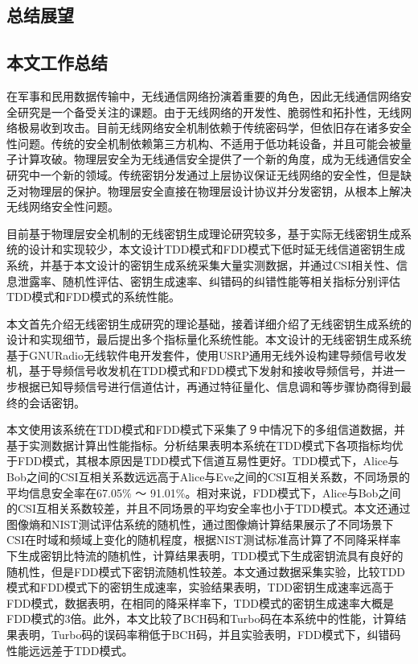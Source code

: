 \documentclass[master]{seuthesis} %
\begin{document}
\begin{Main}
\chapter{总结展望}

\section{本文工作总结}

在军事和民用数据传输中，无线通信网络扮演着重要的角色，因此无线通信网络安全研究是一个备受关注的课题。由于无线网络的开发性、脆弱性和拓扑性，无线网络极易收到攻击。目前无线网络安全机制依赖于传统密码学，但依旧存在诸多安全性问题。传统的安全机制依赖第三方机构、不适用于低功耗设备，并且可能会被量子计算攻破。物理层安全为无线通信安全提供了一个新的角度，成为无线通信安全研究中一个新的领域。传统密钥分发通过上层协议保证无线网络的安全性，但是缺乏对物理层的保护。物理层安全直接在物理层设计协议并分发密钥，从根本上解决无线网络安全性问题。

目前基于物理层安全机制的无线密钥生成理论研究较多，基于实际无线密钥生成系统的设计和实现较少，本文设计TDD模式和FDD模式下低时延无线信道密钥生成系统，并基于本文设计的密钥生成系统采集大量实测数据，并通过CSI相关性、信息泄露率、随机性评估、密钥生成速率、纠错码的纠错性能等相关指标分别评估TDD模式和FDD模式的系统性能。

本文首先介绍无线密钥生成研究的理论基础，接着详细介绍了无线密钥生成系统的设计和实现细节，最后提出多个指标量化系统性能。本文设计的无线密钥生成系统基于GNURadio无线软件电开发套件，使用USRP通用无线外设构建导频信号收发机，基于导频信号收发机在TDD模式和FDD模式下发射和接收导频信号，并进一步根据已知导频信号进行信道估计，再通过特征量化、信息调和等步骤协商得到最终的会话密钥。

本文使用该系统在TDD模式和FDD模式下采集了９中情况下的多组信道数据，并基于实测数据计算出性能指标。分析结果表明本系统在TDD模式下各项指标均优于FDD模式，其根本原因是TDD模式下信道互易性更好。TDD模式下，Alice与Bob之间的CSI互相关系数远远高于Alice与Eve之间的CSI互相关系数，不同场景的平均信息安全率在67.05\% ～ 91.01\%。相对来说，FDD模式下，Alice与Bob之间的CSI互相关系数较差，并且不同场景的平均安全率也小于TDD模式。本文还通过图像熵和NIST测试评估系统的随机性，通过图像熵计算结果展示了不同场景下CSI在时域和频域上变化的随机程度，根据NIST测试标准高计算了不同降采样率下生成密钥比特流的随机性，计算结果表明，TDD模式下生成密钥流具有良好的随机性，但是FDD模式下密钥流随机性较差。本文通过数据采集实验，比较TDD模式和FDD模式下的密钥生成速率，实验结果表明，TDD密钥生成速率远高于FDD模式，数据表明，在相同的降采样率下，TDD模式的密钥生成速率大概是FDD模式的3倍。此外，本文比较了BCH码和Turbo码在本系统中的性能，计算结果表明，Turbo码的误码率稍低于BCH码，并且实验表明，FDD模式下，纠错码性能远远差于TDD模式。


\end{Main}
\end{document}
